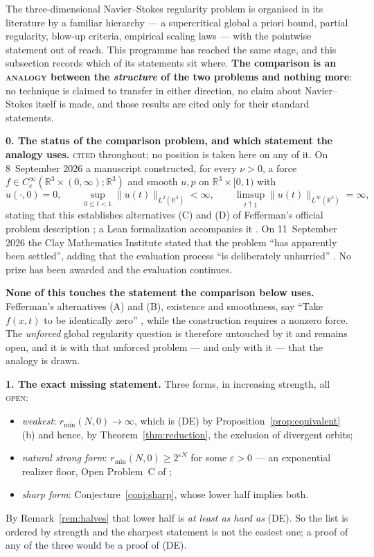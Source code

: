 \documentclass[11pt,reqno]{amsart}
\theoremstyle{plain}
\theoremstyle{definition}
\newcommand{\R}{\mathbb{R}}
\newcommand{\lab}[1]{\textnormal{\textsc{\small #1}}}
\begin{document}
The three-dimensional Navier--Stokes regularity problem is organised in its
literature by a familiar hierarchy --- a supercritical global a priori bound,
partial regularity, blow-up criteria, empirical scaling laws --- with the
pointwise statement out of reach. This programme has reached the same stage, and
this subsection records which of its statements sit where. \textbf{The comparison
is an \lab{analogy} between the \emph{structure} of the two problems and nothing
more}: no technique is claimed to transfer in either direction, no claim about
Navier--Stokes itself is made, and those results are cited only for their standard
statements.

\medskip
\noindent\textbf{0. The status of the comparison problem, and which statement the
analogy uses.} \lab{cited} throughout; no position is taken here on any of it. On
8~September 2026 a manuscript \cite{OpenAINS2026} constructed, for every $\nu>0$,
a force $f\in C_c^{\infty}(\R^3\times(0,\infty);\R^3)$ and smooth $u,p$ on
$\R^3\times[0,1)$ with
\[
u(\cdot,0)=0,\qquad \sup_{0\le t<1}\|u(t)\|_{L^2(\R^3)}<\infty,\qquad
\limsup_{t\uparrow1}\|u(t)\|_{L^{\infty}(\R^3)}=\infty,
\]
stating that this establishes alternatives \textup{(C)} and \textup{(D)} of
Fefferman's official problem description \cite{Fefferman2006}; a Lean
formalization accompanies it \cite{OpenAINSLean}. On 11~September 2026 the Clay
Mathematics Institute stated that the problem ``has apparently been settled'',
adding that the evaluation process ``is deliberately unhurried'' \cite{CMI2026}.
No prize has been awarded and the evaluation continues.

\textbf{None of this touches the statement the comparison below uses.}
Fefferman's alternatives \textup{(A)} and \textup{(B)}, existence and smoothness,
say ``Take $f(x,t)$ to be identically zero'' \cite{Fefferman2006}, while the
construction requires a nonzero force. The \emph{unforced} global regularity
question is therefore untouched by it and remains open, and it is with that
unforced problem --- and only with it --- that the analogy is drawn.

\medskip
\noindent\textbf{1. The exact missing statement.} Three forms, in increasing
strength, all \lab{open}:
\begin{itemize}
\item \emph{weakest}: $r_{\min}(N,0)\to\infty$, which is \textup{(DE)} by
Proposition~\ref{prop:equivalent}\,(b) and hence, by Theorem~\ref{thm:reduction},
the exclusion of divergent orbits;
\item \emph{natural strong form}: $r_{\min}(N,0)\ge 2^{\varepsilon N}$ for some
$\varepsilon>0$ --- an exponential realizer floor, Open Problem~C of
\cite{DeJesusEOC};
\item \emph{sharp form}: Conjecture~\ref{conj:sharp}, whose lower half implies
both.
\end{itemize}
By Remark~\ref{rem:halves} that lower half is \emph{at least as hard as}
\textup{(DE)}. So the list is ordered by strength and the sharpest statement is
not the easiest one; a proof of any of the three would be a proof of (DE).
\end{document}
